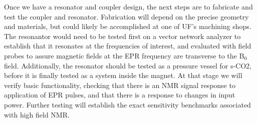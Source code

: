 Once we have a resonator and coupler design, the next steps are to fabricate and test the coupler and resonator. Fabrication will depend on the precise geometry and materials, but could likely be accomplished at one of UF's machining shops. The resonantor would need to be tested first on a vector network analyzer to establish that it resonates at the frequencies of interest, and evaluated with field probes to assure magnetic fields at the EPR frequency are transverse to the B$_0$ field. Additionally, the resonator should be tested as a pressure vessel for s-CO2, before it is finally tested as a system inside the magnet. At that stage we will verify basic functionality, checking that there is an NMR signal response to application of EPR pulses, and that there is a response to changes in input power. Further testing will establish the exact sensitivity benchmarks associated with high field NMR.   




